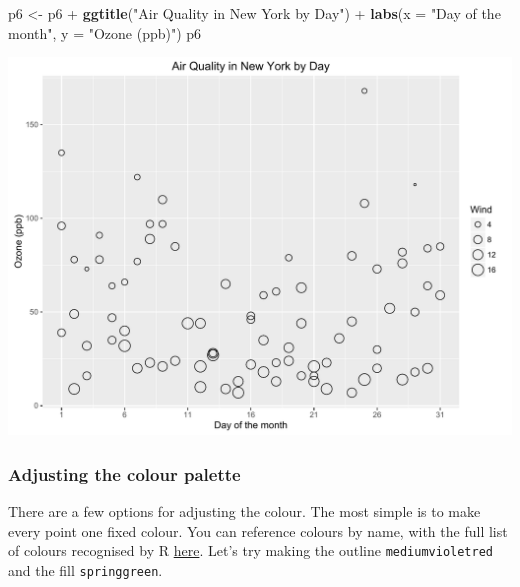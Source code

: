 \documentclass[]{article}
\newenvironment{Shaded}{\begin{snugshade}}{\end{snugshade}}
\newcommand{\KeywordTok}[1]{\textcolor[rgb]{0.13,0.29,0.53}{\textbf{{#1}}}}
\newcommand{\DataTypeTok}[1]{\textcolor[rgb]{0.13,0.29,0.53}{{#1}}}
\newcommand{\StringTok}[1]{\textcolor[rgb]{0.31,0.60,0.02}{{#1}}}
\newcommand{\NormalTok}[1]{{#1}}
\begin{document}
\begin{Shaded}
\begin{Highlighting}[]
\NormalTok{p6 <-}\StringTok{ }\NormalTok{p6 +}\StringTok{ }\KeywordTok{ggtitle}\NormalTok{(}\StringTok{"Air Quality in New York by Day"}\NormalTok{) +}\StringTok{ }
\StringTok{      }\KeywordTok{labs}\NormalTok{(}\DataTypeTok{x =} \StringTok{"Day of the month"}\NormalTok{, }\DataTypeTok{y =} \StringTok{"Ozone (ppb)"}\NormalTok{) }
\NormalTok{p6}
\end{Highlighting}
\end{Shaded}

\begin{center}\includegraphics{0_all_posts_pdf/wscatter_5-1} \end{center}

\subsubsection{Adjusting the colour
palette}\label{adjusting-the-colour-palette-1}

There are a few options for adjusting the colour. The most simple is to
make every point one fixed colour. You can reference colours by name,
with the full list of colours recognised by R
\href{http://www.stat.columbia.edu/~tzheng/files/Rcolor.pdf}{here}.
Let's try making the outline \texttt{mediumvioletred} and the fill
\texttt{springgreen}.
\end{document}
